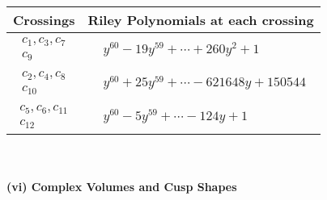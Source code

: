 \documentclass[1p]{elsarticle_modified}
\theoremstyle{definition}
\begin{document}
\begin{tabular}{m{50pt}|m{274pt}}
Crossings & \hspace{64pt}Riley Polynomials at each crossing \\
\hline $$\begin{aligned}c_{1},c_{3},c_{7}\\c_{9}\end{aligned}$$&$\begin{aligned}
&y^{60}-19 y^{59}+\cdots+260 y^2+1
\end{aligned}$\\
\hline $$\begin{aligned}c_{2},c_{4},c_{8}\\c_{10}\end{aligned}$$&$\begin{aligned}
&y^{60}+25 y^{59}+\cdots-621648 y+150544
\end{aligned}$\\
\hline $$\begin{aligned}c_{5},c_{6},c_{11}\\c_{12}\end{aligned}$$&$\begin{aligned}
&y^{60}-5 y^{59}+\cdots-124 y+1
\end{aligned}$\\
\hline
\end{tabular}\\~\\
\newpage\flushleft \textbf{(vi) Complex Volumes and Cusp Shapes}
\end{document}
